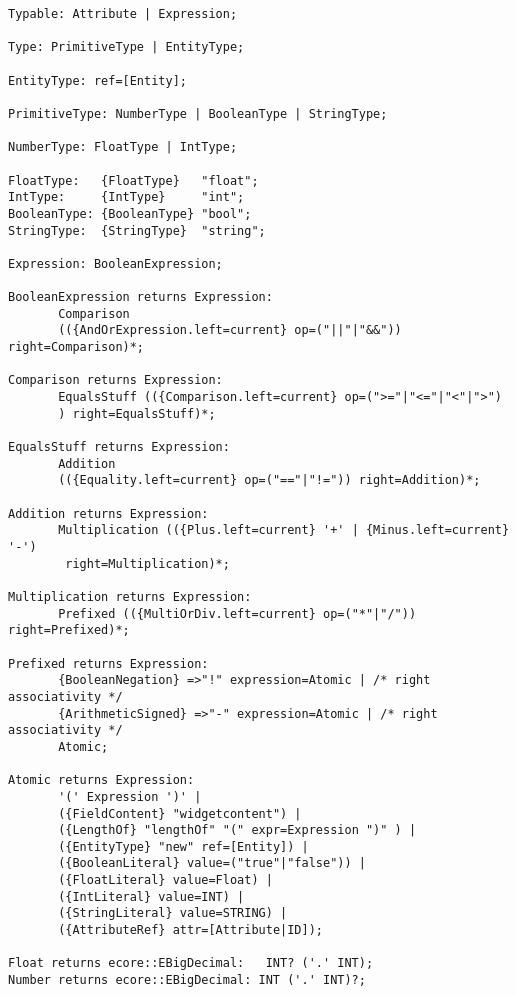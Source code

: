 \begin{lstlisting}[language=xtext,label=lst:grammar-plain-types-and-ex,caption=Types
and Expressions.] 
Typable: Attribute | Expression;

Type: PrimitiveType | EntityType;

EntityType: ref=[Entity];

PrimitiveType: NumberType | BooleanType | StringType;

NumberType: FloatType | IntType;

FloatType:   {FloatType}   "float";
IntType:     {IntType}     "int";
BooleanType: {BooleanType} "bool";
StringType:	 {StringType}  "string";

Expression: BooleanExpression;

BooleanExpression returns Expression:
       Comparison
       (({AndOrExpression.left=current} op=("||"|"&&")) right=Comparison)*;

Comparison returns Expression:
       EqualsStuff (({Comparison.left=current} op=(">="|"<="|"<"|">")
       ) right=EqualsStuff)*;

EqualsStuff returns Expression:
       Addition 
       (({Equality.left=current} op=("=="|"!=")) right=Addition)*;

Addition returns Expression:
       Multiplication (({Plus.left=current} '+' | {Minus.left=current} '-') 
        right=Multiplication)*;

Multiplication returns Expression:
       Prefixed (({MultiOrDiv.left=current} op=("*"|"/")) right=Prefixed)*;

Prefixed returns Expression:
       {BooleanNegation} =>"!" expression=Atomic | /* right associativity */
       {ArithmeticSigned} =>"-" expression=Atomic | /* right associativity */
       Atomic;

Atomic returns Expression:
       '(' Expression ')' |
       ({FieldContent} "widgetcontent") |
       ({LengthOf} "lengthOf" "(" expr=Expression ")" ) |
       ({EntityType} "new" ref=[Entity]) | 
       ({BooleanLiteral} value=("true"|"false")) |
       ({FloatLiteral} value=Float) |
       ({IntLiteral} value=INT) |
       ({StringLiteral} value=STRING) |
       ({AttributeRef} attr=[Attribute|ID]);

Float returns ecore::EBigDecimal:   INT? ('.' INT);
Number returns ecore::EBigDecimal: INT ('.' INT)?;
\end{lstlisting}

%


